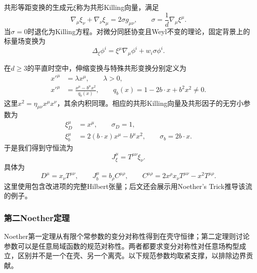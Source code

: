 \begin{example}[共形等距变换与其守恒流]
共形等距变换的生成元$\xi$称为共形Killing向量，满足
\begin{equation}
    \boxed{\nabla_\mu\xi_\nu+\nabla_\nu\xi_\mu
    =2\sigma g_{\mu\nu},
    \qquad\sigma=\frac1d\nabla_\mu\xi^\mu.}
    \label{eq:noether-conformal-killing}
\end{equation}
当$\sigma=0$时退化为Killing方程。对微分同胚协变且Weyl不变的理论，固定背景上的标量场变换为
\begin{equation}
    \Delta_\xi\phi^i
    =\xi^\mu\nabla_\mu\phi^i+w_i\sigma\phi^i.
    \label{eq:noether-fixed-conformal}
\end{equation}

在$d\geq3$的平直时空中，伸缩变换与特殊共形变换分别定义为
\begin{align}
    x'^\mu&=\lambda x^\mu,\qquad\lambda>0,\\
    x'^\mu&=\frac{x^\mu-b^\mu x^2}{q_b(x)},
    \qquad q_b(x)=1-2b\cdot x+b^2x^2\ne0.
\end{align}
这里$x^2=\eta_{\mu\nu}x^\mu x^\nu$，其余内积同理。相应的共形Killing向量及共形因子的无穷小参数为
\begin{align}
    \xi_D^\mu&=x^\mu,\qquad\sigma_D=1,\\
    \xi_b^\mu&=2(b\cdot x)x^\mu-b^\mu x^2,
    \qquad\sigma_b=2b\cdot x.
\end{align}
于是我们得到守恒流为
\begin{equation}
    \boxed{J_\xi^\mu=T^{\mu\nu}\xi_\nu.}
    \label{eq:noether-conformal-current}
\end{equation}
具体为
\begin{equation}
    D^\mu=x_\nu T^{\mu\nu},\qquad
    J_b^\mu=b_\rho C^{\mu\rho},\qquad
    C^{\mu\rho}=2x^\rho x_\nu T^{\mu\nu}-x^2T^{\mu\rho}.
\end{equation}
这里使用包含改进项的完整Hilbert张量；后文还会展示用Noether's Trick推导该流的例子。
\end{example}

\subsubsection{第二Noether定理}

Noether第一定理从有限个常参数的变分对称性得到在壳守恒律；第二定理则讨论参数可以是任意局域函数的规范对称性。两者都要求变分对称性对任意场构型成立，区别并不是一个在壳、另一个离壳。以下规范参数均取紧支撑，以排除边界贡献。

